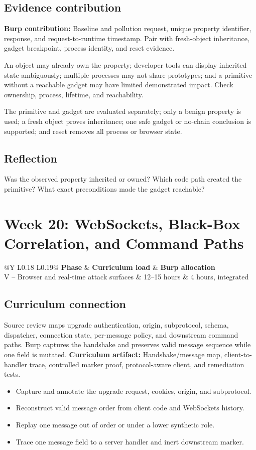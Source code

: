 \documentclass[11pt]{article}
\makeatletter
\newcommand{\weekheader}[5]{%
  \clearpage
  \section{Week #1: #2}
  \begin{tcolorbox}[colback=Navy,colframe=Navy,coltext=white]
    \begin{tabularx}{\linewidth}{@{}Y L{0.18\linewidth} L{0.19\linewidth}@{}}
      \textbf{Phase} & \textbf{Curriculum load} & \textbf{Burp allocation}\\
      #3 & #4 hours & #5 hours, integrated
    \end{tabularx}
  \end{tcolorbox}
}
\newcommand{\weekfield}[2]{%
  \Needspace{5\baselineskip}
  \subsection*{#1}
  #2
}
\newcommand{\curriculumartifact}[1]{\textbf{Curriculum artifact:} #1}
\newcommand{\burpevidence}[1]{\textbf{Burp contribution:} #1}
\makeatother
\begin{document}
\weekfield{Evidence contribution}{\burpevidence{Baseline and pollution request,
unique property identifier, response, and request-to-runtime timestamp.} Pair
with fresh-object inheritance, gadget breakpoint, process identity, and reset
evidence.}

\begin{troubleshootingbox}
An object may already own the property; developer tools can display inherited
state ambiguously; multiple processes may not share prototypes; and a primitive
without a reachable gadget may have limited demonstrated impact. Check ownership,
process, lifetime, and reachability.
\end{troubleshootingbox}

\begin{checkpoints}
The primitive and gadget are evaluated separately; only a benign property is
used; a fresh object proves inheritance; one safe gadget or no-chain conclusion
is supported; and reset removes all process or browser state.
\end{checkpoints}

\weekfield{Reflection}{Was the observed property inherited or owned? Which code
path created the primitive? What exact preconditions made the gadget reachable?}

\weekheader{20}{WebSockets, Black-Box Correlation, and Command Paths}{V -- Browser and real-time attack surfaces}{12--15}{4}

\weekfield{Curriculum connection}{Source review maps upgrade authentication,
origin, subprotocol, schema, dispatcher, connection state, per-message policy,
and downstream command paths. Burp captures the handshake and preserves valid
message sequence while one field is mutated. \curriculumartifact{Handshake/message
map, client-to-handler trace, controlled marker proof, protocol-aware client,
and remediation tests.}}

\begin{objectivebox}
\begin{itemize}
  \item Capture and annotate the upgrade request, cookies, origin, and subprotocol.
  \item Reconstruct valid message order from client code and WebSockets history.
  \item Replay one message out of order or under a lower synthetic role.
  \item Trace one message field to a server handler and inert downstream marker.
\end{itemize}
\end{objectivebox}
\end{document}
